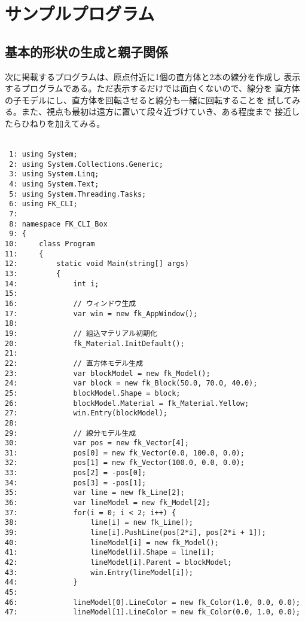 \chapter{サンプルプログラム} \label{chap:sample}
\section{基本的形状の生成と親子関係}
次に掲載するプログラムは、原点付近に1個の直方体と2本の線分を作成し
表示するプログラムである。ただ表示するだけでは面白くないので、線分を
直方体の子モデルにし、直方体を回転させると線分も一緒に回転することを
試してみる。また、視点も最初は遠方に置いて段々近づけていき、ある程度まで
接近したらひねりを加えてみる。\\ ~

\begin{breakbox}
\begin{small}
\begin{verbatim}
 1: using System;
 2: using System.Collections.Generic;
 3: using System.Linq;
 4: using System.Text;
 5: using System.Threading.Tasks;
 6: using FK_CLI;
 7: 
 8: namespace FK_CLI_Box
 9: {
10:     class Program
11:     {
12:         static void Main(string[] args)
13:         {
14:             int i;
15: 
16:             // ウィンドウ生成
17:             var win = new fk_AppWindow();
18: 
19:             // 組込マテリアル初期化
20:             fk_Material.InitDefault();
21: 
22:             // 直方体モデル生成
23:             var blockModel = new fk_Model();
24:             var block = new fk_Block(50.0, 70.0, 40.0);
25:             blockModel.Shape = block;
26:             blockModel.Material = fk_Material.Yellow;
27:             win.Entry(blockModel);
28: 
29:             // 線分モデル生成
30:             var pos = new fk_Vector[4];
31:             pos[0] = new fk_Vector(0.0, 100.0, 0.0);
32:             pos[1] = new fk_Vector(100.0, 0.0, 0.0);
33:             pos[2] = -pos[0];
34:             pos[3] = -pos[1];
35:             var line = new fk_Line[2];
36:             var lineModel = new fk_Model[2];
37:             for(i = 0; i < 2; i++) {
38:                 line[i] = new fk_Line();
39:                 line[i].PushLine(pos[2*i], pos[2*i + 1]);
40:                 lineModel[i] = new fk_Model();
41:                 lineModel[i].Shape = line[i];
42:                 lineModel[i].Parent = blockModel;
43:                 win.Entry(lineModel[i]);
44:             }
45: 
46:             lineModel[0].LineColor = new fk_Color(1.0, 0.0, 0.0);
47:             lineModel[1].LineColor = new fk_Color(0.0, 1.0, 0.0);

\end{verbatim}
\end{small}
\end{breakbox}
